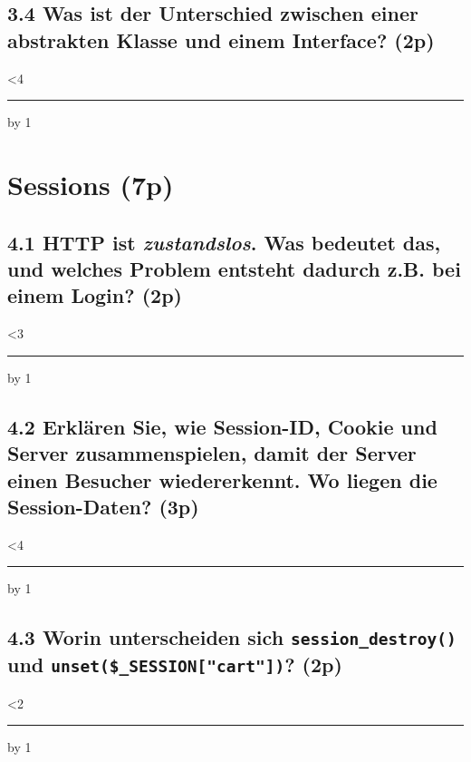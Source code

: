 \documentclass[a4paper,12pt]{article}
\newif\ifsolution
\newcommand{\antwort}[2]{%
  \ifsolution
    \par\smallskip{\color{sol}\textbf{Lösung:} #2}\par\medskip
  \else
    \par\vspace{0.3cm}%
    \answerlines{#1}%
  \fi}
\newcommand{\answerlines}[1]{%
  \linecount=0
  \loop\ifnum\linecount<#1
    \vspace{0.75cm}\noindent\rule{\linewidth}{0.4pt}\par
    \advance\linecount by 1
  \repeat\par\medskip}
\newcommand{\pt}[1]{\hfill\textbf{(#1p)}}
\begin{document}
\subsection*{3.4 \normalsize\mdseries Was ist der Unterschied zwischen einer abstrakten Klasse und einem Interface? \pt{2}}
\antwort{4}{Eine abstrakte Klasse kann nicht mit \texttt{new} erzeugt werden, kann aber neben abstrakten Methoden auch fertige Methoden (und Eigenschaften) enthalten, die vererbt werden; man erbt mit \texttt{extends} (1p). Ein Interface schreibt nur vor, welche Methoden eine Klasse haben muss, ohne Umsetzung; es wird mit \texttt{implements} umgesetzt, und eine Klasse kann zusätzlich von einer Klasse erben (1p).}

\section{Sessions (7p)}

\subsection*{4.1 \normalsize\mdseries HTTP ist \emph{zustandslos}. Was bedeutet das, und welches Problem entsteht dadurch z.B. bei einem Login? \pt{2}}
\antwort{3}{Jeder Request ist unabhängig, der Server erinnert sich nicht an frühere Requests; Variablen existieren nur während eines Requests (1p). Ohne Sessions wäre z.B. der Login-Status beim nächsten Seitenaufruf wieder weg (1p).}

\subsection*{4.2 \normalsize\mdseries Erklären Sie, wie Session-ID, Cookie und Server zusammenspielen, damit der Server einen Besucher wiedererkennt. Wo liegen die Session-Daten? \pt{3}}
\antwort{4}{\texttt{session\_start()} erzeugt beim ersten Besuch eine eindeutige Session-ID und schickt sie als Cookie (\texttt{PHPSESSID}) an den Browser (1p). Der Browser sendet das Cookie bei jedem weiteren Request automatisch mit, und PHP findet anhand der ID die passenden Daten wieder (1p). Die Daten selbst liegen auf dem Server, im Cookie steht nur die ID (1p).}

\subsection*{4.3 \normalsize\mdseries Worin unterscheiden sich \texttt{session\_destroy()} und \texttt{unset(\$\_SESSION["cart"])}? \pt{2}}
\antwort{2}{\texttt{session\_destroy()} löscht alle Daten der Session auf dem Server, z.B. beim Logout (1p). \texttt{unset(\$\_SESSION["cart"])} entfernt nur diesen einen Wert, alle anderen Session-Daten bleiben erhalten (1p).}
\end{document}
